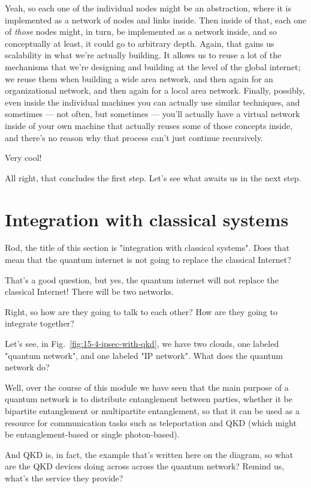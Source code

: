 \rrr Yeah, so each one of the individual nodes might be an abstraction, where it is implemented as a network of nodes and links inside. Then inside of that, each one of \emph{those} nodes might, in turn, be implemented as a network inside, and so conceptually at least, it could go to arbitrary depth. Again, that gains us scalability in what we're actually building. It allows us to reuse a lot of the mechanisms that we're designing and building at the level of the global internet; we reuse them when building a wide area network, and then again for an organizational network, and then again for a local area network. Finally, possibly, even inside the individual machines you can actually use similar techniques, and sometimes --- not often, but sometimes --- you'll actually have a virtual network inside of your own machine that actually reuses some of those concepts inside, and there's no reason why that process can't just continue recursively.

\mmm Very cool!

All right, that concludes the first step. Let's see what awaits us in the next step.

\section{Integration with classical systems}
\label{sec:classical-integration}

\mmm Rod, the title of this section is "integration with classical systems". Does that mean that the quantum internet is not going to replace the classical Internet?

\rrr That's a good question, but yes, the quantum internet will not replace the classical Internet! There will be two networks.

\mmm Right, so how are they going to talk to each other? How are they going to integrate together?

\rrr Let's see, in Fig.~\ref{fig:15-4-ipsec-with-qkd}, we have two clouds, one labeled "quantum network", and one labeled "IP network". What does the quantum network do?

\mmm Well, over the course of this module we have seen that the main purpose of a quantum network is to distribute entanglement between parties, whether it be bipartite entanglement or multipartite entanglement, so that it can be used as a resource for communication tasks such as teleportation and QKD (which might be entanglement-based or single photon-based).

\rrr And QKD is, in fact, the example that's written here on the diagram, so what are the QKD devices doing across across the quantum network? Remind us, what's the service they provide?

